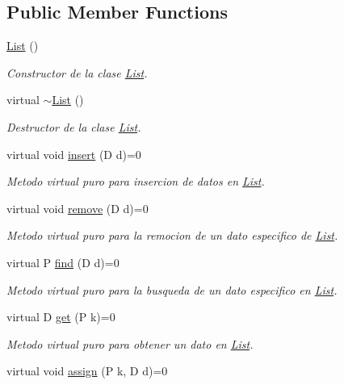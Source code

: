 \subsection*{Public Member Functions}
\begin{DoxyCompactItemize}
\item 
\hyperlink{class_list_a3deb54ab4f51c6c39aa4015f258b5812}{List} ()
\begin{DoxyCompactList}\small\item\em Constructor de la clase \hyperlink{class_list}{List}. \end{DoxyCompactList}\item 
virtual \hyperlink{class_list_a624593fb77847bf7ad4cacfba3442471}{$\sim$\+List} ()
\begin{DoxyCompactList}\small\item\em Destructor de la clase \hyperlink{class_list}{List}. \end{DoxyCompactList}\item 
virtual void \hyperlink{class_list_a01f588d87d47f8332928eca38f7b11bb}{insert} (D d)=0
\begin{DoxyCompactList}\small\item\em Metodo virtual puro para insercion de datos en \hyperlink{class_list}{List}. \end{DoxyCompactList}\item 
virtual void \hyperlink{class_list_a14fc4e853102018df78db3899aa00d71}{remove} (D d)=0
\begin{DoxyCompactList}\small\item\em Metodo virtual puro para la remocion de un dato especifico de \hyperlink{class_list}{List}. \end{DoxyCompactList}\item 
virtual P \hyperlink{class_list_a2b40d6fffc7b2fb5138b648f52c839ee}{find} (D d)=0
\begin{DoxyCompactList}\small\item\em Metodo virtual puro para la busqueda de un dato especifico en \hyperlink{class_list}{List}. \end{DoxyCompactList}\item 
virtual D \hyperlink{class_list_a5bd565e668247ae0691983227367cc88}{get} (P k)=0
\begin{DoxyCompactList}\small\item\em Metodo virtual puro para obtener un dato en \hyperlink{class_list}{List}. \end{DoxyCompactList}\item 
virtual void \hyperlink{class_list_acb062aa988f4048498b30a2d845a311b}{assign} (P k, D d)=0

\end{DoxyCompactItemize}
